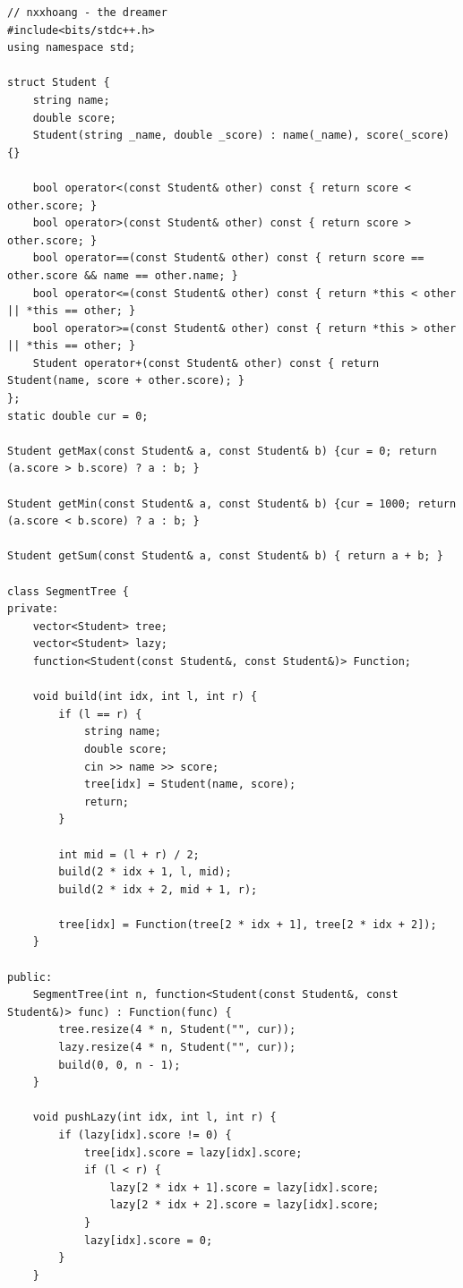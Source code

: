 \documentclass[a4paper]{article}
\begin{document}
\begin{verbatim}
// nxxhoang - the dreamer
#include<bits/stdc++.h>
using namespace std;

struct Student {
    string name;
    double score;
    Student(string _name, double _score) : name(_name), score(_score) {}

    bool operator<(const Student& other) const { return score < other.score; }
    bool operator>(const Student& other) const { return score > other.score; }
    bool operator==(const Student& other) const { return score == other.score && name == other.name; }
    bool operator<=(const Student& other) const { return *this < other || *this == other; }
    bool operator>=(const Student& other) const { return *this > other || *this == other; }
    Student operator+(const Student& other) const { return Student(name, score + other.score); }
};
static double cur = 0;

Student getMax(const Student& a, const Student& b) {cur = 0; return (a.score > b.score) ? a : b; }

Student getMin(const Student& a, const Student& b) {cur = 1000; return (a.score < b.score) ? a : b; }

Student getSum(const Student& a, const Student& b) { return a + b; }

class SegmentTree {
private:
    vector<Student> tree;
    vector<Student> lazy;
    function<Student(const Student&, const Student&)> Function;

    void build(int idx, int l, int r) {
        if (l == r) {
            string name;
            double score;
            cin >> name >> score;
            tree[idx] = Student(name, score);
            return;
        }

        int mid = (l + r) / 2;
        build(2 * idx + 1, l, mid);
        build(2 * idx + 2, mid + 1, r);

        tree[idx] = Function(tree[2 * idx + 1], tree[2 * idx + 2]);
    }

public:
    SegmentTree(int n, function<Student(const Student&, const Student&)> func) : Function(func) {
        tree.resize(4 * n, Student("", cur));
        lazy.resize(4 * n, Student("", cur));
        build(0, 0, n - 1);
    }

    void pushLazy(int idx, int l, int r) {
        if (lazy[idx].score != 0) {
            tree[idx].score = lazy[idx].score;
            if (l < r) {
                lazy[2 * idx + 1].score = lazy[idx].score;
                lazy[2 * idx + 2].score = lazy[idx].score;
            }
            lazy[idx].score = 0;
        }
    }


\end{verbatim}
\end{document}
